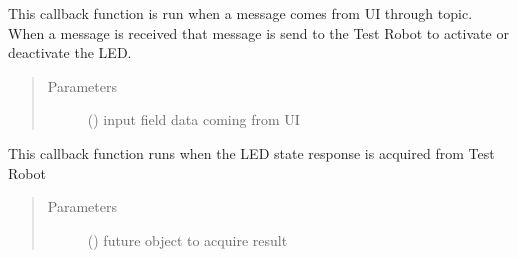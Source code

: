 \documentclass[letterpaper,10pt,english]{sphinxmanual}
\begin{document}
\begin{fulllineitems}
\begin{fulllineitems}
\end{fulllineitems}


\begin{fulllineitems}
\label{\detokenize{index:Control_Hub.control_hub.control_hub.ClientNode.callback_ui_subscription}}
This callback function is run when
a message comes from UI through topic.
When a message is received that message is
send to the Test Robot to activate or deactivate
the LED.
\begin{quote}\begin{description}
\item[{Parameters}] \leavevmode
{} () \textendash{} input field data coming from UI

\end{description}\end{quote}

\end{fulllineitems}


\begin{fulllineitems}
\label{\detokenize{index:Control_Hub.control_hub.control_hub.ClientNode.get_result_callback}}
This callback function runs when
the LED state response is acquired from Test Robot
\begin{quote}\begin{description}
\item[{Parameters}] \leavevmode
{} () \textendash{} future object to acquire result

\end{description}\end{quote}

\end{fulllineitems}


\end{fulllineitems}
\end{document}
